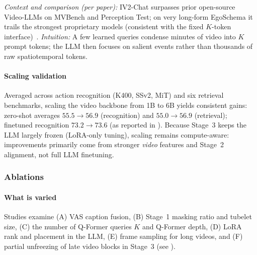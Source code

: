 \begin{enrichment}
\begin{enrichment}
        \noindent
        \emph{Context and comparison (per paper):} IV2-Chat surpasses prior open-source Video-LLMs on MVBench and Perception Test; on very long-form EgoSchema it trails the strongest proprietary models (consistent with the fixed \(K\)-token interface)~\cite{wang2024_internvideo2}. \emph{Intuition:} A few learned queries condense minutes of video into \(K\) prompt tokens; the LLM then focuses on salient events rather than thousands of raw spatiotemporal tokens.
        
        \paragraph{Scaling validation}
        Averaged across action recognition (K400, SSv2, MiT) and six retrieval benchmarks, scaling the video backbone from 1B to 6B yields consistent gains: zero-shot averages \(55.5 \!\rightarrow\! 56.9\) (recognition) and \(55.0 \!\rightarrow\! 56.9\) (retrieval); finetuned recognition \(73.2 \!\rightarrow\! 73.6\) (as reported in \cite{wang2024_internvideo2}). Because Stage~3 keeps the LLM largely frozen (LoRA-only tuning), scaling remains compute-aware: improvements primarily come from stronger \emph{video} features and Stage~2 alignment, not full LLM finetuning.
        
        \subsubsection{Ablations}
        
        \paragraph{What is varied}
        Studies examine (A) VAS caption fusion, (B) Stage~1 masking ratio and tubelet size, (C) the number of Q-Former queries \(K\) and Q-Former depth, (D) LoRA rank and placement in the LLM, (E) frame sampling for long videos, and (F) partial unfreezing of late video blocks in Stage~3 (see \cite{wang2024_internvideo2}).
        

\end{enrichment}
\end{enrichment}
